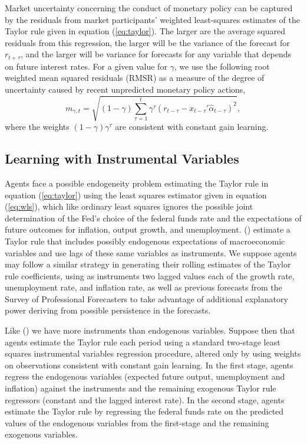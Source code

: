 \documentclass[12pt]{article}
\newcommand{\beq}{\begin{equation}}
\newcommand{\eeq}{\end{equation}}
\newcommand{\citee}[1]{\citename{#1} (\citeyear{#1})}
\newcommand{\ds}{\displaystyle}
\begin{document}
Market uncertainty concerning the conduct of monetary policy can be captured by the residuals from market participants' weighted least-squares estimates of the Taylor rule given in equation (\ref{eq:taylor}).  The larger are the average squared residuals from this regression, the larger will be the variance of the forecast for $r_{t+\tau}$, and the larger will be variance for forecasts for any variable that depends on future interest rates.  For a given value for $\gamma$, we use the following root weighted mean squared residuals (RMSR) as a measure of the degree of uncertainty caused by recent unpredicted monetary policy actions,
\beq \label{eq:mpu} m_{\gamma,t} = \sqrt{ (1-\gamma) \ds \sum_{\tau=1}^{t} \gamma^{\tau} (r_{t-\tau} - x_{t-\tau}'\hat{\alpha}_{t-\tau} )^2}, \eeq  
where the weights $(1-\gamma) \gamma^{\tau}$ are consistent with constant gain learning.

\subsection{Learning with Instrumental Variables}
Agents face a possible endogeneity problem estimating the Taylor rule in equation (\ref{eq:taylor}) using the least squares estimator given in equation (\ref{eq:wls}), which like ordinary least squares ignores the possible joint determination of the Fed's choice of the federal funds rate and the expectations of future outcomes for inflation, output growth, and unemployment.  \citee{cgg2000} estimate a Taylor rule that includes possibly endogenous expectations of macroeconomic variables and use lags of these same variables as instruments.  We suppose agents may follow a similar strategy in generating their rolling estimates of the Taylor rule coefficients, using as instruments two lagged values each of the growth rate, unemployment rate, and inflation rate, as well as previous forecasts from the Survey of Professional Forecasters to take advantage of additional explanatory power deriving from possible persistence in the forecasts.  

Like \citee{cgg2000} we have more instruments than endogenous variables.  Suppose then that agents estimate the Taylor rule each period using a standard two-stage least squares instrumental variables regression procedure, altered only by using weights on observations consistent with constant gain learning.  In the first stage, agents regress the endogenous variables (expected future output, unemployment and inflation) against the instruments and the remaining exogenous Taylor rule regressors (constant and the lagged interest rate).  In the second stage, agents estimate the Taylor rule by regressing the federal funds rate on the predicted values of the endogenous variables from the first-stage and the remaining exogenous variables.
\end{document}
